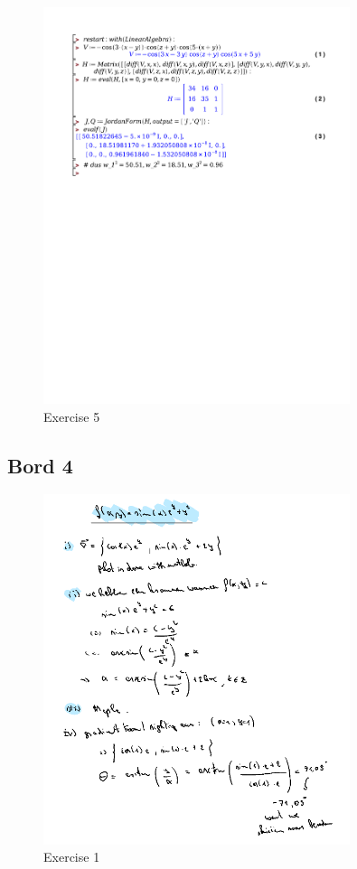 \documentclass[a4paper]{report}
\begin{document}
\begin{figure}[H]
	\centering
	\includegraphics[width=0.8\textwidth]{exercises/huis_4_ex_5.pdf}
	\caption{Exercise 5}
	\label{fig:huis_4_ex_5}
\end{figure}

\subsection*{Bord 4}

\begin{figure}[H]
	\centering
	\includegraphics[width=0.8\textwidth]{assets/bord_4_ex_1.png}
	\caption{Exercise 1}
	\label{fig:bord_4_ex_1}
\end{figure}
\end{document}
